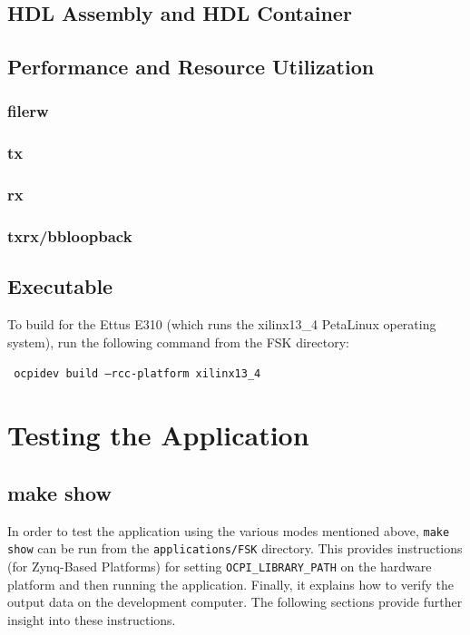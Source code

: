 	\newpage
\subsection{HDL Assembly and HDL Container}
\assetsdoc

\begin{landscape}
\subsection{Performance and Resource Utilization}
\subsubsection{filerw}
\assetsdoc
\subsubsection{tx}

\subsubsection{rx}

\subsubsection{txrx/bbloopback}

\end{landscape}
\subsection{Executable}
\noindent To build for the Ettus E310 (which runs the xilinx13\_4 PetaLinux operating system), run the following command from the FSK directory:\par\medskip
\texttt{ ocpidev build --rcc-platform xilinx13\_4 }\par\medskip
\assetsdoc

\section{Testing the Application}
\assetsdoc
\subsection{make show}
In order to test the application using the various modes mentioned above, \texttt{make show} can be run from the \texttt{applications/FSK} directory. This provides instructions (for Zynq-Based Platforms) for setting \texttt{OCPI\_LIBRARY\_PATH} on the hardware platform and then running the application. Finally, it explains how to verify the output data on the development computer. The following sections provide further insight into these instructions.

